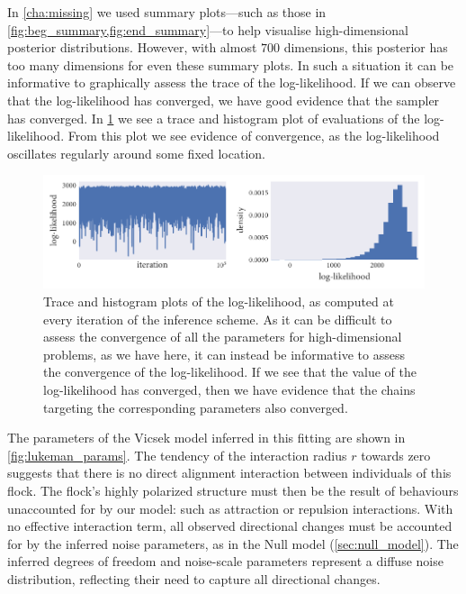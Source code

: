 In \cref{cha:missing} we used summary plots---such as those in
\cref{fig:beg_summary,fig:end_summary}---to help visualise high-dimensional
posterior distributions. However, with almost $700$ dimensions, this posterior
has too many dimensions for even these summary plots. In such a situation it
can be informative to graphically assess the trace of the log-likelihood. If we
can observe that the log-likelihood has converged, we have good evidence that
the sampler has converged. In \cref{fig:log_ll} we see a trace and histogram
plot of evaluations of the log-likelihood. From this plot we see evidence of
convergence, as the log-likelihood oscillates regularly around some fixed
location.

\begin{figure}[tb]
  \includegraphics{log_likelihood.pdf}
  \caption{Trace and histogram plots of the log-likelihood, as computed at
    every iteration of the inference scheme. As it can be difficult to assess
    the convergence of all the parameters for high-dimensional problems, as
    we have here, it can instead be informative to assess the convergence of
    the log-likelihood. If we see that the value of the log-likelihood has
    converged, then we have evidence that the chains targeting the corresponding
    parameters also converged.}
    \label{fig:log_ll}
\end{figure}

The parameters of the Vicsek model inferred in this fitting are shown in
\cref{fig:lukeman_params}. The tendency of the interaction radius $r$ towards
zero suggests that there is no direct alignment interaction between individuals
of this flock. The flock's highly polarized structure must then be the result
of behaviours unaccounted for by our model: such as attraction or repulsion
interactions. With no effective interaction term, all observed directional
changes must be accounted for by the inferred noise parameters, as in the Null
model (\cref{sec:null_model}). The inferred degrees of freedom and noise-scale
parameters represent a diffuse noise distribution, reflecting their need to
capture all directional changes.

